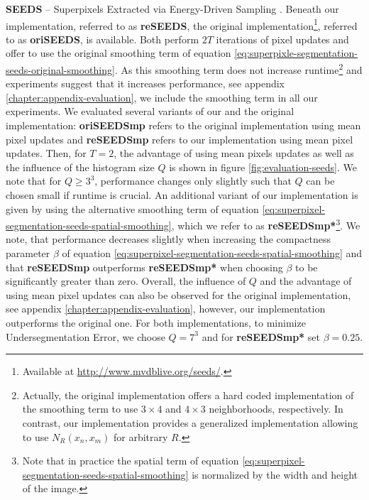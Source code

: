 \textbf{SEEDS} -- Superpixels Extracted via Energy-Driven Sampling \cite{VanDenBerghBoixRoigCapitaniVanGool:2012}. Beneath our implementation, referred to as \textbf{reSEEDS}, the original implementation\footnote{Available at \url{http://www.mvdblive.org/seeds/}.}, referred to as \textbf{oriSEEDS}, is available. Both perform $2T$ iterations of pixel updates and offer to use the original smoothing term of equation \eqref{eq:superpixle-segmentation-seeds-original-smoothing}. As this smoothing term does not increase runtime\footnote{Actually, the original implementation offers a hard coded implementation of the smoothing term to use $3 \times 4$ and $4 \times 3$ neighborhoods, respectively. In contrast, our implementation provides a generalized implementation allowing to use $N_R(x_n,x_m)$ for arbitrary $R$.} and experiments suggest that it increases performance, see appendix \ref{chapter:appendix-evaluation}, we include the smoothing term in all our experiments. We evaluated several variants of our and the original implementation: \textbf{oriSEEDSmp} refers to the original implementation using mean pixel updates and \textbf{reSEEDSmp} refers to our implementation using mean pixel updates. Then, for $T = 2$, the advantage of using mean pixels updates as well as the influence of the histogram size $Q$ is shown in figure \ref{fig:evaluation-seeds}. We note that for $Q \geq 3^3$, performance changes only slightly such that $Q$ can be chosen small if runtime is crucial. An additional variant of our implementation is given by using the alternative smoothing term of equation \eqref{eq:superpixel-segmentation-seeds-spatial-smoothing}, which we refer to as \textbf{reSEEDSmp*}\footnote{Note that in practice the spatial term of equation \eqref{eq:superpixel-segmentation-seeds-spatial-smoothing} is normalized by the width and height of the image.}. We note, that performance decreases slightly when increasing the compactness parameter $\beta$ of equation \eqref{eq:superpixel-segmentation-seeds-spatial-smoothing} and that \textbf{reSEEDSmp} outperforms \textbf{reSEEDSmp*} when choosing $\beta$ to be significantly greater than zero. Overall, the influence of $Q$ and the advantage of using mean pixel updates can also be observed for the original implementation, see appendix \ref{chapter:appendix-evaluation}, however, our implementation outperforms the original one. For both implementations, to minimize Undersegmentation Error, we choose $Q = 7^3$ and for \textbf{reSEEDSmp*} set $\beta = 0.25$.

